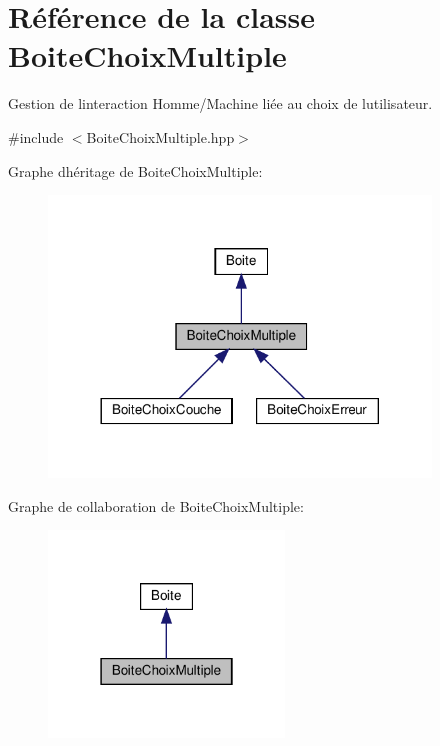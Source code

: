 \hypertarget{classBoiteChoixMultiple}{}\section{Référence de la classe Boite\+Choix\+Multiple}
\label{classBoiteChoixMultiple}


Gestion de l\textquotesingle{}interaction Homme/\+Machine liée au choix de l\textquotesingle{}utilisateur.  




{\ttfamily \#include $<$Boite\+Choix\+Multiple.\+hpp$>$}



Graphe d\textquotesingle{}héritage de Boite\+Choix\+Multiple\+:
\nopagebreak
\begin{figure}[H]
\begin{center}
\leavevmode
\includegraphics[width=288pt]{classBoiteChoixMultiple__inherit__graph}
\end{center}
\end{figure}


Graphe de collaboration de Boite\+Choix\+Multiple\+:
\nopagebreak
\begin{figure}[H]
\begin{center}
\leavevmode
\includegraphics[width=178pt]{classBoiteChoixMultiple__coll__graph}
\end{center}
\end{figure}
